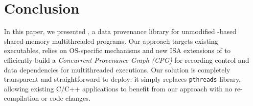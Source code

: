 \section{Conclusion}
\label{sec:conclusion}

In this paper, we presented \projecttitle, a data provenance library for unmodified \pthreads-based shared-memory multithreaded programs. Our approach targets existing executables, relies on OS-specific mechanisms and new ISA extensions of \intelpt  to efficiently build a {\em Concurrent Provenance Graph (CPG)} for recording control and data dependencies for multithreaded executions. Our solution is completely  transparent and straightforward to deploy: it simply replaces {\tt pthreads} library, allowing existing C/C++ applications to benefit from our approach with no re-compilation or code changes.

